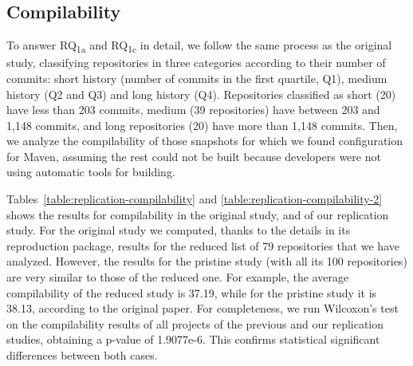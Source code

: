\subsection{Compilability}

To answer RQ\textsubscript{1a} and RQ\textsubscript{1c} in detail, we follow the same process as the original study, classifying repositories in three categories according to their number of commits: short history (number of commits in the first quartile, Q1), medium history (Q2 and Q3) and long history (Q4). Repositories classified as short (20) have less than 203 commits, medium (39 repositories) have between 203 and 1,148 commits, and long repositories (20) have more than 1,148 commits. Then, we analyze the compilability of those snapshots for which we found configuration for Maven, assuming the rest could not be built because developers were not using automatic tools for building.


Tables~\ref{table:replication-compilability} and \ref{table:replication-compilability-2} shows the results for compilability in the original study, and of our replication study. For the original study we computed, thanks to the details in its reproduction package, results for the reduced list of 79 repositories that we have analyzed. However, the results for the pristine study (with all its 100 repositories) are very similar to those of the reduced one. For example, the average compilability of the reduced study is 37.19, while for the pristine study it is 38.13, according to the original paper. For completeness, we run Wilcoxon's test on the compilability results of all projects of the previous and our replication studies, obtaining a p-value of 1.9077e-6. This confirms statistical significant differences between both cases.

